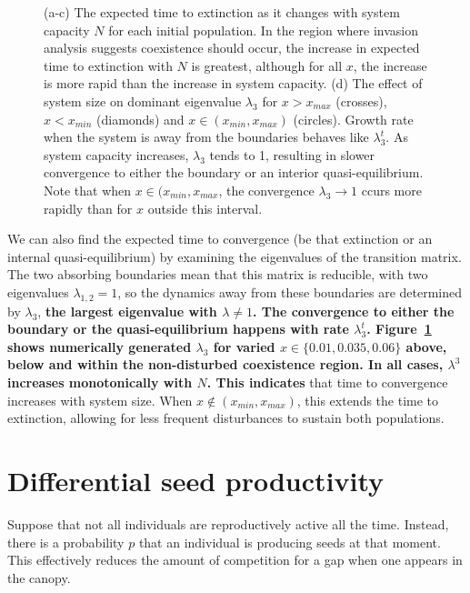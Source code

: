 \begin{figure}[th]
   \caption[How time to extinction varies with system capacity]{(a-c) The expected time to extinction as it changes with system capacity $N$ for each initial population. In the region where invasion analysis suggests coexistence should occur, the increase in expected time to extinction with $N$ is greatest, although for all $x$, the increase is more rapid than the increase in system capacity. (d) The effect of system size on dominant eigenvalue $\lambda_3$ for $x>x_{max}$ (crosses), $x<x_{min}$ (diamonds) and $x \in(x_{min},x_{max})$ (circles). Growth rate when the system is away from the boundaries behaves like $\lambda_3^t$. As system capacity increases, $\lambda_3$ tends to 1, resulting in slower convergence to either the boundary or an interior quasi-equilibrium. Note that when $x \in (x_{min},x_{max}$, the convergence $\lambda_3 \to 1$ ccurs more rapidly than for $x$ outside this interval.}
 \label{fig:tte}
\end{figure}

We can also find the expected time to convergence (be that extinction or an internal quasi-equilibrium) by examining the eigenvalues of the transition matrix. The two absorbing boundaries mean that this matrix is reducible, with two eigenvalues $\lambda_{1,2}=1$, so the dynamics away from these boundaries are determined by $\lambda_3$, \textbf{the largest eigenvalue with $\lambda \neq 1$. The convergence to either the boundary or the quasi-equilibrium happens with rate $\lambda_3^t$. Figure~\ref{fig:tte} shows numerically generated $\lambda_3$ for varied $x \in \{0.01,0.035,0.06\}$ above, below and within the non-disturbed coexistence region. In all cases, $\lambda^3$ increases monotonically with $N$. This indicates} that time to convergence increases with system size. When $x \not\in (x_{min},x_{max})$, this extends the time to extinction, allowing for less frequent disturbances to sustain both populations.



 \section{Differential seed productivity}
\label{app2c}
Suppose that not all individuals are reproductively active all the time. Instead, there is a probability  $p$ that an individual is producing seeds at that moment. This effectively reduces the amount of competition for a gap when one appears in the canopy.

